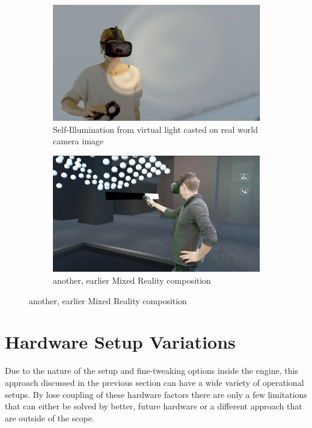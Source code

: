 \begin{figure}[htbp]
\begin{subfigure}[t]{.49\textwidth}
		\includegraphics[width=\textwidth]{gfx/results/self-illu.png}
		\caption{Self-Illumination from virtual light casted on real world 
			camera image}
	\end{subfigure}
	\hfill
	\begin{subfigure}[t]{.49\textwidth}
		\centering
		\includegraphics[width=\textwidth]{gfx/results/mr-action_old.png}
		\caption{another, earlier Mixed Reality composition}
	\end{subfigure}
\end{figure}

\section{Hardware Setup Variations}
\label{sec:eval:hardware}

Due to the nature of the setup and fine-tweaking options inside the engine, 
this approach discussed in the previous section can have a wide variety of 
operational setups. By lose coupling of these hardware factors there are only a 
few limitations that can either be solved by better, future hardware or a 
different approach that are outside of the scope.

